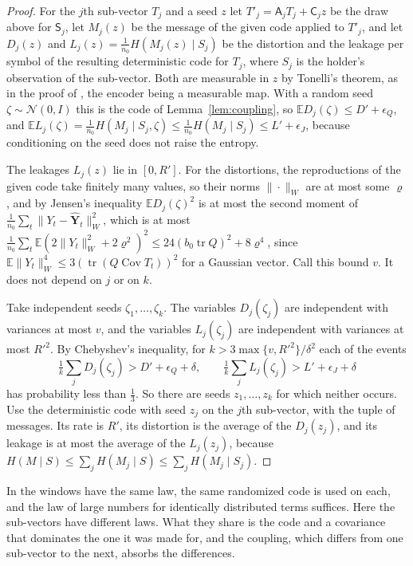 \documentclass[11pt,onecolumn]{IEEEtran}
\newcommand{\E}{\mathbb{E}}
\newcommand{\tr}{\operatorname{tr}}
\newcommand{\Cov}{\operatorname{Cov}}
\newcommand{\hY}{\hat{\mathbf Y}}
\begin{document}
\begin{proof}
For the $j$th sub-vector $T_j$ and a seed $z$ let
$T'_j=\mathsf A_jT_j+\mathsf C_jz$ be the draw above for
$\mathsf S_j$, let $M_j(z)$ be the message of the given code applied
to $T'_j$, and let $D_j(z)$ and $L_j(z)=\tfrac1{n_0}H(M_j(z)\mid S_j)$ be
the distortion and the leakage per symbol of the resulting
deterministic code for $T_j$, where $S_j$ is the holder's observation
of the sub-vector. Both are measurable in $z$ by Tonelli's theorem, as
in the proof of \cite[Lemma~19]{part2}, the encoder being a measurable
map. With a random seed
$\zeta\sim\mathcal N(0,I)$ this is the code of
Lemma~\ref{lem:coupling}, so
$\E D_j(\zeta)\le D'+\epsilon_Q$, and
$\E L_j(\zeta)=\tfrac1{n_0}H(M_j\mid S_j,\zeta)\le\tfrac1{n_0}H(M_j\mid S_j)\le L'+\epsilon_J$,
because conditioning on the seed does not raise the entropy.

The leakages $L_j(z)$ lie in $[0,R']$. For the distortions, the
reproductions of the given code take finitely many values, so their
norms $\|\cdot\|_W$ are at most some $\varrho$, and by Jensen's inequality
$\E D_j(\zeta)^2$ is at most the second moment of
$\tfrac1{n_0}\sum_t\|Y_t-\hY_t\|_W^2$, which is at most
$\tfrac1{n_0}\sum_t\E(2\|Y_t\|_W^2+2\varrho^2)^2\le24(b_0\tr Q)^2+8\varrho^4$,
since $\E\|Y_t\|_W^4\le3(\tr(Q\Cov T_t))^2$ for a Gaussian vector. Call
this bound $v$. It does not depend on $j$ or on $k$.

Take independent seeds $\zeta_1,\dots,\zeta_k$. The variables
$D_j(\zeta_j)$ are independent with variances at most $v$, and the
variables $L_j(\zeta_j)$ are independent with variances at most
$R'^2$. By Chebyshev's inequality, for $k>3\max\{v,R'^2\}/\delta^2$ each
of the events
\[
\tfrac1k\sum_jD_j(\zeta_j)>D'+\epsilon_Q+\delta,\qquad
\tfrac1k\sum_jL_j(\zeta_j)>L'+\epsilon_J+\delta
\]
has probability less than $\tfrac13$. So there are seeds
$z_1,\dots,z_k$ for which neither occurs. Use the deterministic code
with seed $z_j$ on the $j$th sub-vector, with the tuple of messages.
Its rate is $R'$, its distortion is the average of the $D_j(z_j)$, and
its leakage is at most the average of the $L_j(z_j)$, because
$H(M\mid S)\le\sum_jH(M_j\mid S)\le\sum_jH(M_j\mid S_j)$.
\end{proof}

In \cite[Lemma~19]{part2} the windows have the same law, the same
randomized code is used on each, and the law of large numbers for
identically distributed terms suffices. Here the sub-vectors have
different laws. What they share is the code and a covariance that
dominates the one it was made for, and the coupling, which differs
from one sub-vector to the next, absorbs the differences.
\end{document}
